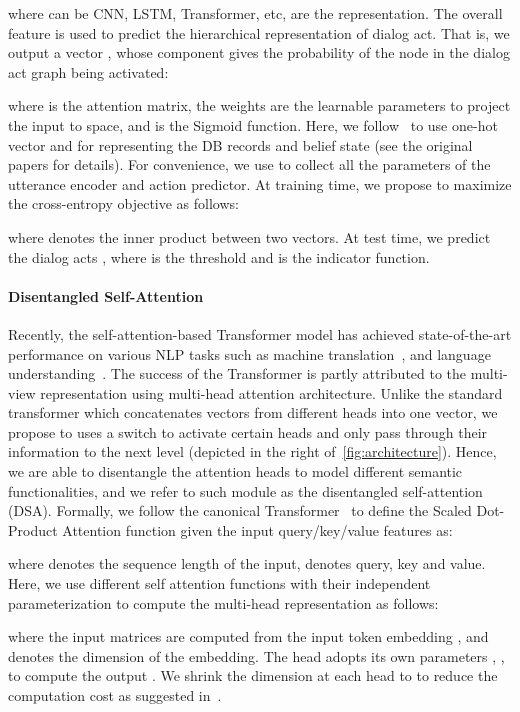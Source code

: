 \documentclass[11pt,a4paper]{article}
\begin{document}
where  can be CNN, LSTM, Transformer, etc,  are the representation. The overall feature  is used to predict the hierarchical representation of dialog act. That is, we output a vector , whose  component gives the probability of the  node in the dialog act graph being activated:

where  is the attention matrix, the weights  are the learnable parameters to project the input to  space, and  is the Sigmoid function. Here, we follow~\citet{DBLP:conf/emnlp/BudzianowskiWTC18,DBLP:conf/eacl/Rojas-BarahonaG17} to use one-hot vector  and  for representing the DB records and belief state (see the original papers for details). 
For convenience, we use  to collect all the parameters of the utterance encoder and action predictor. At training time, we propose to maximize the cross-entropy objective  as follows:

where  denotes the inner product between two vectors. At test time, we predict the dialog acts , where  is the threshold and  is the indicator function.


\paragraph{Disentangled Self-Attention}
Recently, the self-attention-based Transformer model has achieved state-of-the-art performance on various NLP tasks such as machine translation~\cite{vaswani2017attention}, and language understanding~\cite{devlin2018bert,radford2018improving}. The success of the Transformer is partly attributed to the multi-view representation using multi-head attention architecture. Unlike the standard transformer which concatenates vectors from different heads into one vector, we propose to uses a switch to activate certain heads and only pass through their information to the next level (depicted in the right of~\autoref{fig:architecture}). Hence, we are able to disentangle the  attention heads to model  different semantic functionalities, and we refer to such module as the disentangled self-attention (DSA). Formally, we follow the canonical Transformer~\cite{vaswani2017attention} to define the Scaled Dot-Product Attention function given the input query/key/value features  as: 

where  denotes the sequence length of the input,  denotes query, key and value. Here, we use  different self attention functions with their independent parameterization to compute the multi-head representation  as follows: 

where the input matrices  are computed from the input token embedding , and  denotes the dimension of the embedding. The  head adopts its own parameters , ,  to compute the output . We shrink the dimension at each head to  to reduce the computation cost as suggested in~\citet{vaswani2017attention}. 
\end{document}
